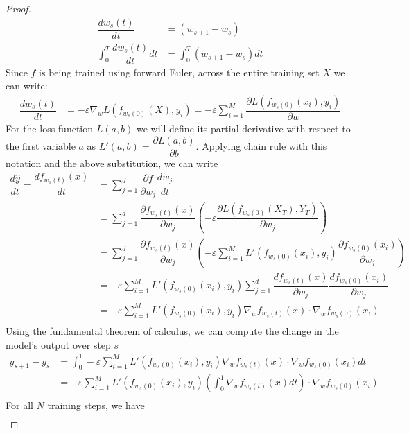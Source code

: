\begin{proof}
\begin{align}
    \dfrac{d w_s(t)}{dt} &= (w_{s+1} - w_s)\\   
    \int_0^T \dfrac{d w_s(t)}{dt} dt &= \int_0^T (w_{s+1} - w_s)dt
\end{align}
Since $f$ is being trained using forward Euler, across the entire training set $X$ we can write:
\begin{align}
    \dfrac{d w_s(t)}{dt} &= -\varepsilon \nabla_w L(f_{w_s(0)}(X), y_i) = -\varepsilon  \sum_{i=1}^M  \dfrac{\partial L(f_{w_s(0)}(x_i),  y_i)}{\partial w} \label{eq10}
\end{align}
For the loss function $L(a, b)$ we will define its partial derivative with respect to the first variable $a$ as $L'(a, b) = \dfrac{\partial L(a, b)}{\partial b}$. Applying chain rule with this notation and the above substitution, we can write
\begin{align}
    \dfrac{d \hat y}{dt} = \dfrac{d f_{w_s(t)}(x)}{dt} &= \sum_{j = 1}^{d} \dfrac{\partial f}{\partial w_j} \dfrac{d w_j}{dt}\\
&= \sum_{j = 1}^{d} \dfrac{\partial f_{w_s(t)}(x)}{\partial w_j} \left(-\varepsilon \dfrac{\partial L(f_{w_s(0)}(X_T),  Y_T)}{\partial w_j}\right)\\
&= \sum_{j = 1}^{d} \dfrac{\partial f_{w_s(t)}(x)}{\partial w_j} \left(-\varepsilon \sum_{i = 1}^{M}L'(f_{w_s(0)}(x_i),  y_i) \dfrac{\partial  f_{w_s(0)}(x_i)}{\partial w_j}\right)\\
&= -\varepsilon \sum_{i = 1}^{M} L'(f_{w_s(0)}(x_i),  y_i) \sum_{j = 1}^{d} \dfrac{d f_{w_s(t)}(x)}{\partial w_j}  \dfrac{d f_{w_s(0)}(x_i)}{\partial w_j}\\
&= -\varepsilon \sum_{i = 1}^{M} L'(f_{w_s(0)}(x_i),  y_i) \nabla_w f_{w_s(t)}(x) \cdot \nabla_w f_{w_s(0)}(x_i)\label{eq11}\\
\end{align}
Using the fundamental theorem of calculus, we can compute the change in the model's output over step $s$
\begin{align}
    y_{s+1} - y_s &= \int_0^1 -\varepsilon \sum_{i = 1}^{M} L'(f_{w_s(0)}(x_i),  y_i)  \nabla_w f_{w_s(t)}(x) \cdot \nabla_w f_{w_s(0)}(x_i)dt\\
 &=  -\varepsilon \sum_{i = 1}^{M} L'(f_{w_s(0)}(x_i),  y_i) \left(\int_0^1\nabla_w f_{w_s(t)}(x)dt\right) \cdot \nabla_w f_{w_s(0)}(x_i)\\
\end{align}
For all $N$ training steps, we have
\begin{align*}

\end{align*}
\end{proof}
